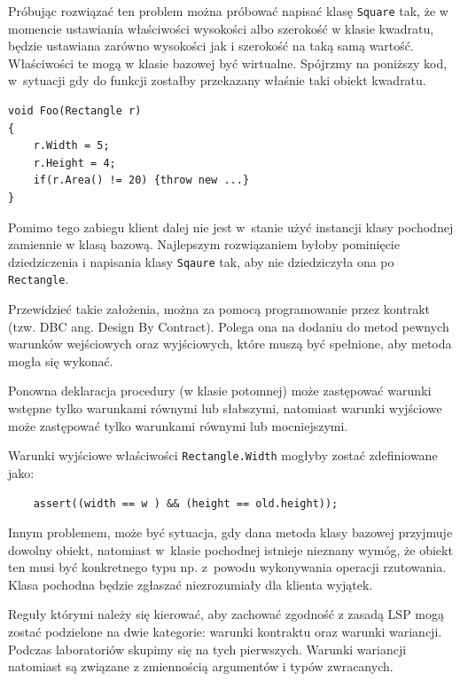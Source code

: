 Próbując rozwiązać ten problem można próbować napisać klasę \texttt{Square} tak, że w momencie ustawiania właściwości wysokości albo szerokość w klasie kwadratu, będzie ustawiana zarówno wysokości jak i szerokość na taką samą wartość. Właściwości te mogą w klasie bazowej być wirtualne. Spójrzmy na poniższy kod, w~sytuacji gdy do funkcji zostałby przekazany właśnie taki obiekt kwadratu.
\begin{lstlisting}[caption={Naruszenie zasady LSP}, label={lab1/lst/lspViolationSquareRectangle}]
void Foo(Rectangle r)
{
	r.Width = 5;
	r.Height = 4;
	if(r.Area() != 20) {throw new ...}
}
\end{lstlisting}

Pomimo tego zabiegu klient dalej nie jest w~stanie użyć instancji klasy pochodnej zamiennie w klasą bazową. Najlepszym rozwiązaniem byłoby pominięcie dziedziczenia i napisania klasy \texttt{Sqaure} tak, aby nie dziedziczyła ona po \texttt{Rectangle}.

Przewidzieć takie założenia, można za pomocą  programowanie przez kontrakt (tzw. DBC ang. Design By Contract). Polega ona na dodaniu do metod pewnych warunków wejściowych oraz wyjściowych, które muszą być spełnione, aby metoda mogła się wykonać. 

\begin{mybox}
Ponowna deklaracja procedury (w klasie potomnej) może zastępować warunki wstępne tylko warunkami równymi lub słabszymi, natomiast warunki wyjściowe może zastępować tylko warunkami równymi lub mocniejszymi.
\end{mybox}

Warunki wyjściowe właściwości \texttt{Rectangle.Width} mogłyby zostać zdefiniowane jako:
\begin{lstlisting}
	assert((width == w ) && (height == old.height));
\end{lstlisting}

Innym problemem, może być sytuacja, gdy dana metoda klasy bazowej przyjmuje dowolny obiekt, natomiast w~klasie pochodnej istnieje nieznany wymóg, że obiekt ten musi być konkretnego typu np. z~powodu wykonywania operacji rzutowania. Klasa pochodna będzie zgłaszać niezrozumiały dla klienta wyjątek.

Reguły którymi należy się kierować, aby zachować zgodność z zasadą LSP mogą zostać podzielone na dwie kategorie: warunki kontraktu oraz warunki wariancji. Podczas laboratoriów skupimy się na tych pierwszych. Warunki wariancji natomiast są związane z zmiennością argumentów i typów zwracanych. 

